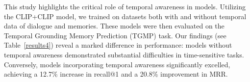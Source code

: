 \begin{table}[h]

\centering
{}
\vspace{-2mm} 
\caption{\label{results4}
Ablation study of baseline CLIP+CLIP without time information.
}
\vspace{-2mm} 
\end{table}


This study highlights the critical role of temporal awareness in models. Utilizing the CLIP+CLIP model, we trained on datasets both with and without temporal data of dialogue and memories. These models were then evaluated on the Temporal Grounding Memory Prediction (TGMP) task. Our findings (see Table~\ref{results4}) reveal a marked difference in performance: models without temporal awareness demonstrated substantial difficulties in time-sensitive tasks. Conversely, models incorporating temporal awareness significantly excelled, achieving a 12.7\% increase in recall@1 and a 20.8\% improvement in MRR.


